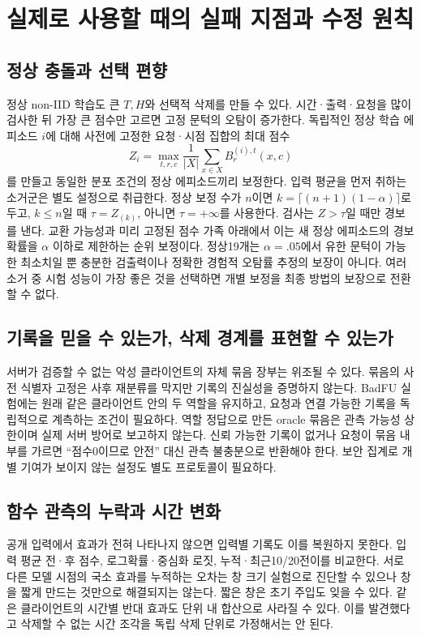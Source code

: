 \documentclass[10pt,a4paper]{article}
\begin{document}
\section{실제로 사용할 때의 실패 지점과 수정 원칙}
\subsection{정상 충돌과 선택 편향}
정상 non-IID 학습도 큰 $T,H$와 선택적 삭제를 만들 수 있다.
시간·출력·요청을 많이 검사한 뒤 가장 큰 점수만 고르면 고정 문턱의 오탐이 증가한다.
독립적인 정상 학습 에피소드 $i$에 대해 사전에 고정한 요청·시점 집합의 최대 점수
\begin{equation}
 Z_i=\max_{t,r,c}\frac1{|X|}\sum_{x\in X}B^{(i),t}_r(x,c)
\end{equation}
를 만들고 동일한 분포 조건의 정상 에피소드끼리 보정한다.
입력 평균을 먼저 취하는 소거군은 별도 설정으로 취급한다.
정상 보정 수가 $n$이면 $k=\lceil(n+1)(1-\alpha)\rceil$로 두고,
$k\le n$일 때 $\tau=Z_{(k)}$, 아니면 $\tau=+\infty$를 사용한다.
검사는 $Z>\tau$일 때만 경보를 낸다. 교환 가능성과 미리 고정된 점수 가족 아래에서
이는 새 정상 에피소드의 경보 확률을 $\alpha$ 이하로 제한하는 순위 보정이다.
정상19개는 $\alpha=.05$에서 유한 문턱이 가능한 최소치일 뿐 충분한 검출력이나
정확한 경험적 오탐률 추정의 보장이 아니다. 여러 소거 중 시험 성능이 가장 좋은 것을
선택하면 개별 보정을 최종 방법의 보장으로 전환할 수 없다.

\subsection{기록을 믿을 수 있는가, 삭제 경계를 표현할 수 있는가}
서버가 검증할 수 없는 악성 클라이언트의 자체 묶음 장부는 위조될 수 있다.
묶음의 사전 식별자 고정은 사후 재분류를 막지만 기록의 진실성을 증명하지 않는다.
BadFU 실험에는 원래 같은 클라이언트 안의 두 역할을 유지하고,
요청과 연결 가능한 기록을 독립적으로 계측하는 조건이 필요하다.
역할 정답으로 만든 oracle 묶음은 관측 가능성 상한이며 실제 서버 방어로 보고하지 않는다.
신뢰 가능한 기록이 없거나 요청이 묶음 내부를 가르면 ``점수0이므로 안전'' 대신
관측 불충분으로 반환해야 한다. 보안 집계로 개별 기여가 보이지 않는 설정도 별도 프로토콜이 필요하다.

\subsection{함수 관측의 누락과 시간 변화}
공개 입력에서 효과가 전혀 나타나지 않으면 입력별 기록도 이를 복원하지 못한다.
입력 평균 전·후 점수, 로그확률·중심화 로짓, 누적·최근10/20전이를 비교한다.
서로 다른 모델 시점의 국소 효과를 누적하는 오차는 창 크기 실험으로 진단할 수 있으나
창을 짧게 만드는 것만으로 해결되지는 않는다. 짧은 창은 초기 주입도 잊을 수 있다.
같은 클라이언트의 시간별 반대 효과도 단위 내 합산으로 사라질 수 있다.
이를 발견했다고 삭제할 수 없는 시간 조각을 독립 삭제 단위로 가정해서는 안 된다.
\end{document}
